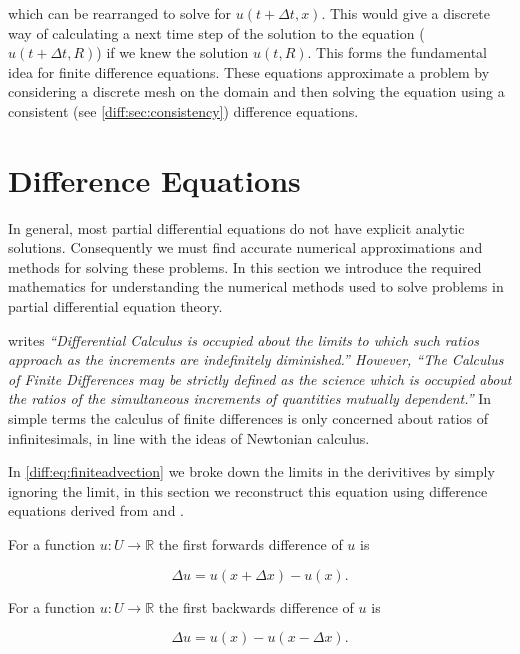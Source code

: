 \documentclass[../main.tex]{subfiles}
\begin{document}
  which can be rearranged to solve for $u(t + \Delta t, x)$. This would give a discrete way of calculating a next time step  of the solution to the equation ($u(t + \Delta t, R)$) if we knew the solution $u(t, R)$. This forms the fundamental idea for finite difference equations. These equations approximate a problem by considering a discrete mesh on the domain and then solving the equation using a consistent (see \autoref{diff:sec:consistency}) difference equations.

  \section{Difference Equations}
  In general, most partial differential equations do not have explicit analytic solutions. Consequently we must find accurate numerical approximations and methods for solving these problems. In this section we introduce the required mathematics for understanding the numerical methods used to solve problems in partial differential equation theory.

  \cite{boole1880} writes \emph{``Differential Calculus is occupied about the limits to which such ratios approach as the increments are indefinitely diminished.'' However, ``The Calculus of Finite Differences may be strictly defined as the science which is occupied about the ratios of the simultaneous increments of quantities mutually dependent.''} In simple terms the calculus of finite differences is only concerned about ratios of infinitesimals, in line with the ideas of Newtonian calculus.

  In \autoref{diff:eq:finiteadvection} we broke down the limits in the derivitives by simply ignoring the limit, in this section we reconstruct this equation using difference equations derived from \cite{boole1880} and \cite{hildebrand1987}.

  \begin{definition}
    For a function $u: U \to \mathbb{R}$ the first forwards difference of $u$ is

    \begin{equation}
      \Delta u = u(x + \Delta x) - u(x).
    \end{equation}
  \end{definition}

  \begin{definition}
    For a function $u: U \to \mathbb{R}$ the first backwards difference of $u$ is

    \begin{equation}
      \Delta u = u(x) - u(x - \Delta x).
    \end{equation}
  \end{definition}
\end{document}
